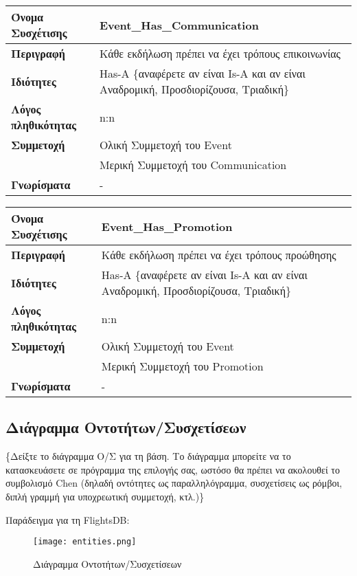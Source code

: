 \begin{tabular}[]{|p{4cm}|p{10cm}|}
  \hline
  \textbf{Όνομα Συσχέτισης} & Event\_Has\_Communication\\ \hline
  \textbf{Περιγραφή} & Κάθε εκδήλωση πρέπει να έχει τρόπους επικοινωνίας\\ \hline
  \textbf{Ιδιότητες} & Has-A \{αναφέρετε αν είναι Is-A και αν είναι
                       Αναδρομική, Προσδιορίζουσα, Τριαδική\} \\ \hline
  \textbf{Λόγος πληθικότητας} & n:n \\ \hline
  \textbf{Συμμετοχή} & Ολική Συμμετοχή του Event \\ \cline{2-2}
                     & Μερική Συμμετοχή του Communication \\ \hline
  \textbf{Γνωρίσματα} & - \\ \hline
\end{tabular}

\begin{tabular}[]{|p{4cm}|p{10cm}|}
  \hline
  \textbf{Όνομα Συσχέτισης} & Event\_Has\_Promotion\\ \hline
  \textbf{Περιγραφή} & Κάθε εκδήλωση πρέπει να έχει τρόπους προώθησης\\ \hline
  \textbf{Ιδιότητες} & Has-A \{αναφέρετε αν είναι Is-A και αν είναι
                       Αναδρομική, Προσδιορίζουσα, Τριαδική\} \\ \hline
  \textbf{Λόγος πληθικότητας} & n:n \\ \hline
  \textbf{Συμμετοχή} & Ολική Συμμετοχή του Event \\ \cline{2-2}
                     & Μερική Συμμετοχή του Promotion \\ \hline
  \textbf{Γνωρίσματα} & - \\ \hline
\end{tabular}

\subsection{Διάγραμμα Οντοτήτων/Συσχετίσεων}

\{Δείξτε το διάγραμμα Ο/Σ για τη βάση. Το διάγραμμα μπορείτε να το
κατασκευάσετε σε πρόγραμμα της επιλογής σας, ωστόσο θα πρέπει να
ακολουθεί το συμβολισμό Chen (δηλαδή οντότητες ως παραλληλόγραμμα,
συσχετίσεις ως ρόμβοι, διπλή γραμμή για υποχρεωτική συμμετοχή, κτλ.)\}

Παράδειγμα για τη FlightsDB:
\begin{figure}[H]
  \centering
  \texttt{[image: entities.png]}
  \caption{Διάγραμμα Οντοτήτων/Συσχετίσεων}
\end{figure}


